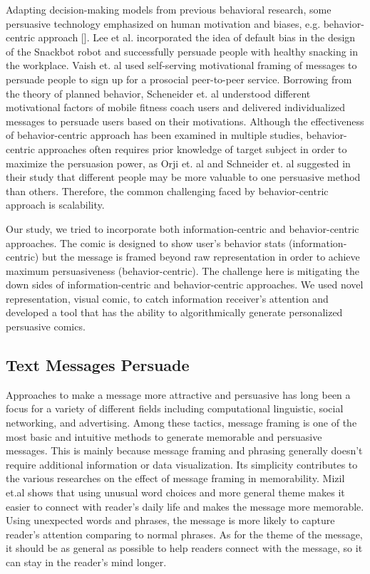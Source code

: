 Adapting decision-making models from previous behavioral research, some persuasive technology emphasized on human motivation and biases, e.g. behavior-centric approach []. Lee et al. incorporated the idea of default bias in the design of the Snackbot robot and successfully persuade people with healthy snacking in the workplace. Vaish et. al used self-serving motivational framing of messages to persuade people to sign up for a prosocial peer-to-peer service. Borrowing from the theory of planned behavior, Scheneider et. al understood different motivational factors of mobile fitness coach users and delivered individualized messages to persuade users based on their motivations. Although the effectiveness of behavior-centric approach has been examined in multiple studies, behavior-centric approaches often requires prior knowledge of target subject in order to maximize the persuasion power, as Orji et. al and Schneider et. al suggested in their study that different people may be more valuable to one persuasive method than others.  Therefore, the common challenging faced by behavior-centric approach is scalability.\par

Our study, we tried to incorporate both information-centric and behavior-centric approaches. The comic is designed to show user's behavior stats (information-centric) but the message is framed beyond raw representation in order to achieve maximum persuasiveness (behavior-centric). The challenge here is mitigating the down sides of information-centric and behavior-centric approaches. We used novel representation, visual comic, to catch information receiver's attention and developed a tool that has the ability to algorithmically generate personalized persuasive comics.
\par

\subsection{Text Messages Persuade}
Approaches to make a message more attractive and persuasive has long been a focus for a variety of different fields including computational linguistic, social networking, and advertising. Among these tactics, message framing is one of the most basic and intuitive methods to generate memorable and persuasive messages. This is mainly because message framing and phrasing generally doesn't require additional information or data visualization. Its simplicity contributes to the various researches on the effect of message framing in memorability. Mizil et.al shows that using unusual word choices and more general theme makes it easier to connect with reader's daily life and makes the message more memorable. Using unexpected words and phrases, the message is more likely to capture reader's attention comparing to normal phrases. As for the theme of the message, it should be as general as possible to help readers connect with the message, so it can stay in the reader's mind longer.\par

